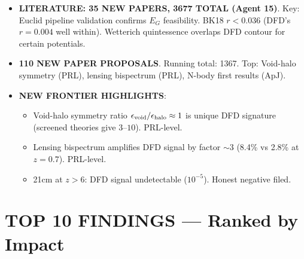\documentclass[11pt,a4paper]{article}
\begin{document}
\begin{itemize}
\item \textbf{LITERATURE: 35 NEW PAPERS, 3677 TOTAL (Agent 15)}. Key: Euclid pipeline validation confirms $E_G$ feasibility. BK18 $r < 0.036$ (DFD's $r = 0.004$ well within). Wetterich quintessence overlaps DFD contour for certain potentials.

\item \textbf{110 NEW PAPER PROPOSALS}. Running total: 1367. Top: Void-halo symmetry (PRL), lensing bispectrum (PRL), N-body first results (ApJ).

\item \textbf{NEW FRONTIER HIGHLIGHTS}:
  \begin{itemize}[nosep]
  \item Void-halo symmetry ratio $\epsilon_{\rm void}/\epsilon_{\rm halo} \approx 1$ is unique DFD signature (screened theories give $3$--$10$). PRL-level.
  \item Lensing bispectrum amplifies DFD signal by factor $\sim 3$ (8.4\% vs 2.8\% at $z = 0.7$). PRL-level.
  \item 21cm at $z > 6$: DFD signal undetectable ($10^{-5}$). Honest negative filed.
  \end{itemize}
\end{itemize}

\section{TOP 10 FINDINGS --- Ranked by Impact}
\label{sec:top10}
\end{document}
